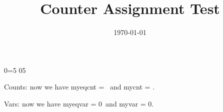 \documentclass[letterpaper]{article}
\date{\today}
\title{Counter Assignment Test}
\begin{document}
\maketitle

\newcount\myeqcnt
\newcount\mycnt
%

\newcommand\myeqvar{0}
\newcommand\myvar{0}
%
\myeqvar=5
\myvar5

Counts: now we have myeqcnt = \the\myeqcnt\ and mycnt = \the\mycnt.

Vars: now we have myeqvar = \myeqvar\ and myvar = \myvar.
\end{document}
